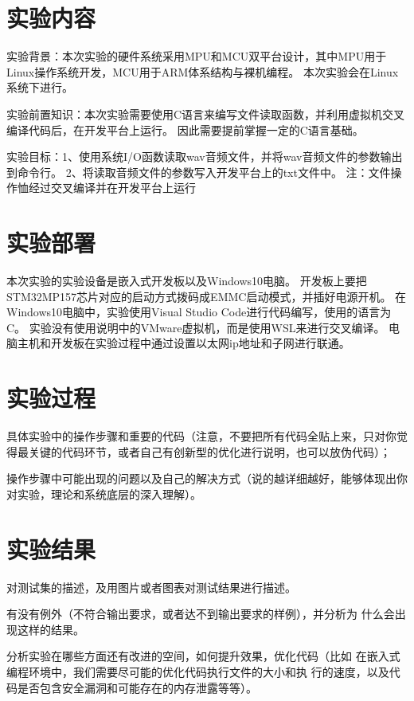 \section{实验内容}

实验背景：本次实验的硬件系统采用MPU和MCU双平台设计，其中MPU用于Linux操作系统开发，MCU用于ARM体系结构与裸机编程。
本次实验会在Linux系统下进行。

实验前置知识：本次实验需要使用C语言来编写文件读取函数，并利用虚拟机交叉编译代码后，在开发平台上运行。
因此需要提前掌握一定的C语言基础。

实验目标：1、使用系统I/O函数读取wav音频文件，并将wav音频文件的参数输出到命令行。
2、将读取音频文件的参数写入开发平台上的txt文件中。
注：文件操作恤经过交叉编译并在开发平台上运行

\section{实验部署}

本次实验的实验设备是嵌入式开发板以及Windows10电脑。
开发板上要把STM32MP157芯片对应的启动方式拨码成EMMC启动模式，并插好电源开机。
在Windows10电脑中，实验使用Visual Studio Code进行代码编写，使用的语言为C。
实验没有使用说明中的VMware虚拟机，而是使用WSL来进行交叉编译。
电脑主机和开发板在实验过程中通过设置以太网ip地址和子网进行联通。

\section{实验过程}

具体实验中的操作步骤和重要的代码（注意，不要把所有代码全贴上来，只对你觉得最关键的代码环节，或者自己有创新型的优化进行说明，也可以放伪代码）；

操作步骤中可能出现的问题以及自己的解决方式（说的越详细越好，能够体现出你对实验，理论和系统底层的深入理解）。


\section{实验结果}

对测试集的描述，及用图片或者图表对测试结果进行描述。

有没有例外（不符合输出要求，或者达不到输出要求的样例），并分析为
什么会出现这样的结果。

分析实验在哪些方面还有改进的空间，如何提升效果，优化代码（比如
在嵌入式编程环境中，我们需要尽可能的优化代码执行文件的大小和执
行的速度，以及代码是否包含安全漏洞和可能存在的内存泄露等等）。



